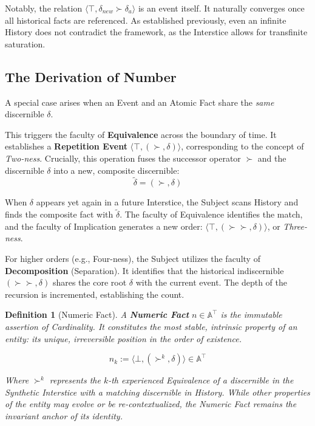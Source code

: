 \documentclass[11pt, a4paper]{article}
\theoremstyle{formalism}
\newtheorem{formalism}{Definition}
\begin{document}
Notably, the relation $\langle \top, \delta_{new} \succ \delta_{a}\rangle$ is an event itself. It naturally converges once all historical facts are referenced. As established previously, even an infinite History does not contradict the framework, as the Interstice allows for transfinite saturation.

\subsection{The Derivation of Number}

A special case arises when an Event and an Atomic Fact share the \textit{same} discernible $\delta$. 

This triggers the faculty of \textbf{Equivalence} across the boundary of time. It establishes a \textbf{Repetition Event} $\langle \top, (\succ, \delta) \rangle$, corresponding to the concept of \textit{Two-ness}. Crucially, this operation fuses the successor operator $\succ$ and the discernible $\delta$ into a new, composite discernible:
\begin{equation}
    \tilde{\delta} = (\succ, \delta)
\end{equation}

When $\delta$ appears yet again in a future Interstice, the Subject scans History and finds the composite fact with $\tilde{\delta}$. The faculty of Equivalence identifies the match, and the faculty of Implication generates a new order: $\langle \top, (\succ \succ, \delta) \rangle$, or \textit{Three-ness}.

For higher orders (e.g., Four-ness), the Subject utilizes the faculty of \textbf{Decomposition} (Separation). It identifies that the historical indiscernible $(\succ \succ, \delta)$ shares the core root $\delta$ with the current event. The depth of the recursion is incremented, establishing the count.

\begin{formalism}[Numeric Fact]

	A \textbf{Numeric Fact} $n \in \mathbb{A}^\top$ is the immutable assertion
    of Cardinality. It constitutes the most stable, intrinsic property of an 
    entity: its unique, irreversible position in the order of existence.
    
    \begin{equation}
        n_k := \langle \bot, (\succ^k, \delta) \rangle \in \mathbb{A}^\top
    \end{equation}

    Where $\succ^k$ represents the $k$-th experienced Equivalence of a 
    discernible in the Synthetic Interstice with a matching discernible 
    in History. While other properties of the entity may evolve or be 
    re-contextualized, the Numeric Fact remains the invariant anchor of its 
    identity.
\end{formalism}
\end{document}
